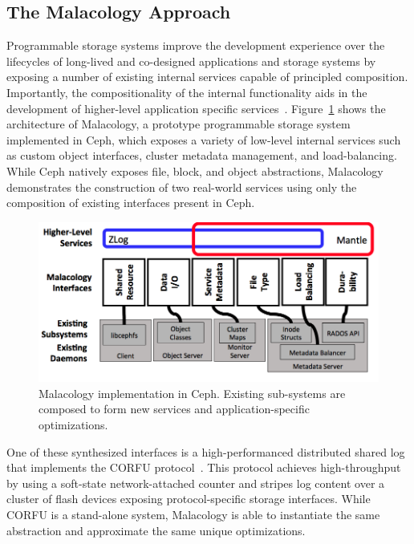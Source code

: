 \subsection{The Malacology Approach}


Programmable storage systems improve the development experience over the lifecycles of long-lived and co-designed applications
and storage systems by exposing a number of existing internal services capable of principled composition. Importantly, the compositionality of the internal functionality aids in the development of higher-level application specific services~\cite{sevilla:eurosys17}.
Figure~\ref{fig:malacology} shows the architecture of Malacology, a prototype programmable storage system
implemented in Ceph, which exposes a variety of low-level internal services
such as custom object interfaces, cluster metadata management, and
load-balancing. While Ceph natively exposes file, block, and object
abstractions, Malacology demonstrates the construction of two real-world
services using only the composition of existing interfaces present in Ceph.

\begin{figure}[t]
\centering
\includegraphics[width=1.0\linewidth]{implementation-overview.png}
\caption{Malacology implementation in Ceph. Existing sub-systems are composed
    to form new services and application-specific optimizations.}
\label{fig:malacology}
\end{figure}

One of these synthesized interfaces is a high-performanced distributed shared
log that implements the CORFU protocol~\cite{balakrishnan:nsdi12}.
This protocol achieves high-throughput by using a soft-state network-attached
counter and stripes log content over a cluster of flash devices exposing
protocol-specific storage interfaces. While CORFU is a stand-alone system,
Malacology is able to instantiate the same abstraction and approximate 
the same unique optimizations.

